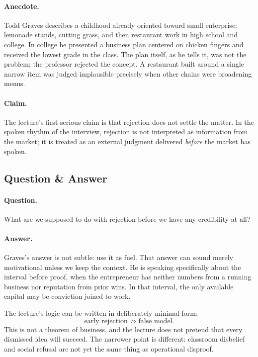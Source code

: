 \paragraph{Anecdote.}
Todd Graves describes a childhood already oriented toward small enterprise: lemonade stands, cutting grass, and then restaurant work in high school and college. In college he presented a business plan centered on chicken fingers and received the lowest grade in the class. The plan itself, as he tells it, was not the problem; the professor rejected the concept. A restaurant built around a single narrow item was judged implausible precisely when other chains were broadening menus.

\paragraph{Claim.}
The lecture's first serious claim is that rejection does not settle the matter. In the spoken rhythm of the interview, rejection is not interpreted as information from the market; it is treated as an external judgment delivered \emph{before} the market has spoken.

\subsection{Question \& Answer}

\paragraph{Question.}
What are we supposed to do with rejection before we have any credibility at all?

\paragraph{Answer.}
Graves's answer is not subtle: use it as fuel. That answer can sound merely motivational unless we keep the context. He is speaking specifically about the interval before proof, when the entrepreneur has neither numbers from a running business nor reputation from prior wins. In that interval, the only available capital may be conviction joined to work.

The lecture's logic can be written in deliberately minimal form:
\begin{equation}
\text{early rejection} \not\Rightarrow \text{false model}.
\end{equation}
This is not a theorem of business, and the lecture does not pretend that every dismissed idea will succeed. The narrower point is different: classroom disbelief and social refusal are not yet the same thing as operational disproof.

